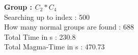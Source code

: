 \textbf{Group : $C_2*C_4$}\\
Searching up to index : 500\\
How many normal groups are found : 688\\
Total Time in s : 230.8\\
Total Magma-Time in s : 470.73\\
